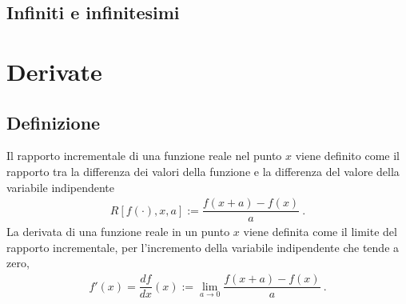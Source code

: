 \documentclass[letterpaper,10pt,english]{jupyterBook}
\begin{document}
\subsection{Infiniti e infinitesimi}
\label{\detokenize{ch/infinitesimal_calculus/limits:infiniti-e-infinitesimi}}
\sphinxstepscope


\section{Derivate}
\label{\detokenize{ch/infinitesimal_calculus/derivatives:derivate}}\label{\detokenize{ch/infinitesimal_calculus/derivatives:infinitesimal-calculus-derivatives}}\label{\detokenize{ch/infinitesimal_calculus/derivatives::doc}}

\subsection{Definizione}
\label{\detokenize{ch/infinitesimal_calculus/derivatives:definizione}}\label{\detokenize{ch/infinitesimal_calculus/derivatives:infinitesimal-calculus-derivatives-def}}
\sphinxAtStartPar
{} Il rapporto incrementale di una funzione reale nel punto \(x\) viene definito come il rapporto tra la differenza dei valori della funzione e la differenza del valore della variabile indipendente
\begin{equation}\label{equation:ch/infinitesimal_calculus/derivatives:eq:infinitesimal-calculus:derivatives:def_delta}
\begin{split}R[f(\cdot), x, a] := \dfrac{f(x+a)-f(x)}{a} \ .\end{split}
\end{equation}
\sphinxAtStartPar
{} La derivata di una funzione reale in un punto \(x\) viene definita come il limite del rapporto incrementale, per l’incremento della variabile indipendente che tende a zero,
\begin{equation}\label{equation:ch/infinitesimal_calculus/derivatives:eq:infinitesimal-calculus:derivatives:def}
\begin{split}f'(x) = \dfrac{d f}{d x}(x) := \lim_{a \rightarrow 0} \dfrac{f(x+a)-f(x)}{a} \ .\end{split}
\end{equation}
\sphinxAtStartPar
{} 
\end{document}
